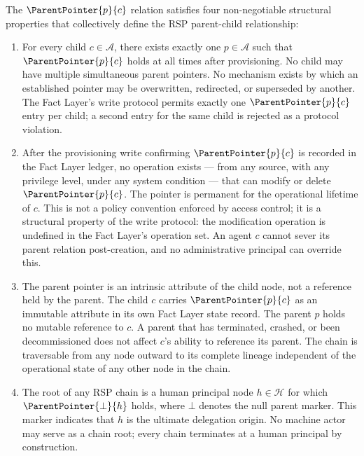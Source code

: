 The $\ParentPointer{p}{c}$ relation satisfies four non-negotiable structural properties that collectively define the RSP parent-child relationship:

\begin{enumerate}
    \item[(P1) \textbf{Uniqueness}] For every child $c \in \mathcal{A}$, there exists exactly one $p \in \mathcal{A}$ such that $\ParentPointer{p}{c}$ holds at all times after provisioning. No child may have multiple simultaneous parent pointers. No mechanism exists by which an established pointer may be overwritten, redirected, or superseded by another. The Fact Layer's write protocol permits exactly one $\ParentPointer{p}{c}$ entry per child; a second entry for the same child is rejected as a protocol violation.

    \item[(P2) \textbf{Immutability after assignment}] After the provisioning write confirming $\ParentPointer{p}{c}$ is recorded in the Fact Layer ledger, no operation exists — from any source, with any privilege level, under any system condition — that can modify or delete $\ParentPointer{p}{c}$. The pointer is permanent for the operational lifetime of $c$. This is not a policy convention enforced by access control; it is a structural property of the write protocol: the modification operation is undefined in the Fact Layer's operation set. An agent $c$ cannot sever its parent relation post-creation, and no administrative principal can override this.

    \item[(P3) \textbf{Directionality}] The parent pointer is an intrinsic attribute of the child node, not a reference held by the parent. The child $c$ carries $\ParentPointer{p}{c}$ as an immutable attribute in its own Fact Layer state record. The parent $p$ holds no mutable reference to $c$. A parent that has terminated, crashed, or been decommissioned does not affect $c$'s ability to reference its parent. The chain is traversable from any node outward to its complete lineage independent of the operational state of any other node in the chain.

    \item[(P4) \textbf{Human Anchor Termination}] The root of any RSP chain is a human principal node $h \in \mathcal{H}$ for which $\ParentPointer{\bot}{h}$ holds, where $\bot$ denotes the null parent marker. This marker indicates that $h$ is the ultimate delegation origin. No machine actor may serve as a chain root; every chain terminates at a human principal by construction.
\end{enumerate}

